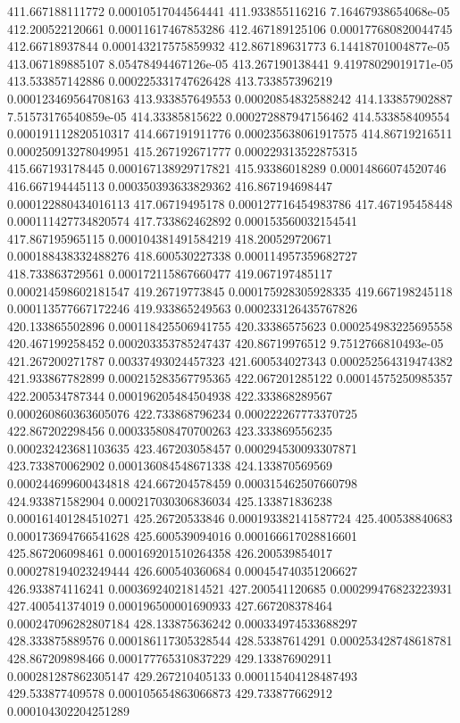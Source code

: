 {411.667188111772 0.00010517044564441
411.933855116216 7.16467938654068e-05
412.200522120661 0.00011617467853286
412.467189125106 0.000177680820044745
412.66718937844 0.000143217575859932
412.867189631773 6.14418701004877e-05
413.067189885107 8.05478494467126e-05
413.267190138441 9.41978029019171e-05
413.533857142886 0.000225331747626428
413.733857396219 0.000123469564708163
413.933857649553 0.00020854832588242
414.133857902887 7.51573176540859e-05
414.33385815622 0.000272887947156462
414.533858409554 0.000191112820510317
414.667191911776 0.000235638061917575
414.86719216511 0.000250913278049951
415.267192671777 0.000229313522875315
415.667193178445 0.000167138929717821
415.93386018289 0.00014866074520746
416.667194445113 0.000350393633829362
416.867194698447 0.000122880434016113
417.06719495178 0.000127716454983786
417.467195458448 0.000111427734820574
417.733862462892 0.000153560032154541
417.867195965115 0.000104381491584219
418.200529720671 0.000188438332488276
418.600530227338 0.000114957359682727
418.733863729561 0.000172115867660477
419.067197485117 0.000214598602181547
419.26719773845 0.000175928305928335
419.667198245118 0.000113577667172246
419.933865249563 0.000233126435767826
420.133865502896 0.000118425506941755
420.33386575623 0.000254983225695558
420.467199258452 0.000203353785247437
420.86719976512 9.7512766810493e-05
421.267200271787 0.00337493024457323
421.600534027343 0.000252564319474382
421.933867782899 0.000215283567795365
422.067201285122 0.00014575250985357
422.200534787344 0.000196205484504938
422.333868289567 0.000260860363605076
422.733868796234 0.000222267773370725
422.867202298456 0.000335808470700263
423.333869556235 0.000232423681103635
423.467203058457 0.000294530093307871
423.733870062902 0.000136084548671338
424.133870569569 0.000244699600434818
424.667204578459 0.000315462507660798
424.933871582904 0.000217030306836034
425.133871836238 0.000161401284510271
425.26720533846 0.000193382141587724
425.400538840683 0.000173694766541628
425.600539094016 0.000166617028816601
425.867206098461 0.000169201510264358
426.200539854017 0.000278194023249444
426.600540360684 0.000454740351206627
426.933874116241 0.00036924021814521
427.200541120685 0.000299476823223931
427.400541374019 0.000196500001690933
427.667208378464 0.000247096282807184
428.133875636242 0.000334974533688297
428.333875889576 0.000186117305328544
428.53387614291 0.000253428748618781
428.867209898466 0.000177765310837229
429.133876902911 0.000281287862305147
429.267210405133 0.000115404128487493
429.533877409578 0.000105654863066873
429.733877662912 0.000104302204251289
}
